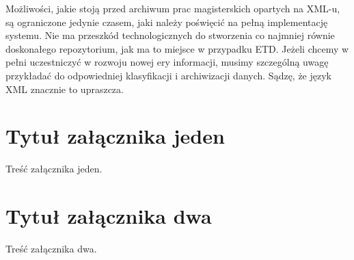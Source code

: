 \documentclass[document]{xmgr}
\begin{document}
\summary
Możliwości, jakie stoją przed archiwum prac magisterskich opartych na
XML-u, są ograniczone jedynie czasem, jaki należy poświęcić na pełną
implementację systemu. Nie ma przeszkód technologicznych do stworzenia
co najmniej równie doskonałego repozytorium, jak ma to miejsce w
przypadku ETD. Jeżeli chcemy w pełni uczestniczyć w rozwoju nowej ery
informacji, musimy szczególną uwagę przykładać do odpowiedniej
klasyfikacji i archiwizacji danych. Sądzę, że język XML znacznie to
upraszcza.

\appendix
\chapter{Tytuł załącznika jeden}

Treść załącznika jeden.

\chapter{Tytuł załącznika dwa}

Treść załącznika dwa.




\listoftables

\listoffigures

\oswiadczenie
\end{document}
